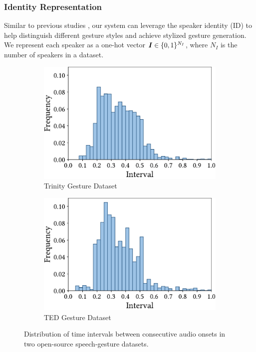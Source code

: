 \subsubsection{Identity Representation}
Similar to previous studies \cite{yoon2020speech,bhattacharya2021speech2affectivegestures}, our system can leverage the speaker identity (ID) to help distinguish different gesture styles and achieve stylized gesture generation. We represent each speaker as a one-hot vector $\bm{I}\in\{0,1\}^{N_I}$, where $N_I$ is the number of speakers in a dataset.
%
\begin{figure}[t]
    \centering    
    \begin{subfigure}[t]{0.47\linewidth}
        \centering
        \caption*{Trinity Gesture Dataset}
        \includegraphics[width=\linewidth]{figures/onset_interval_trinity.pdf}
   \end{subfigure}
   \hspace{\fill}
    \begin{subfigure}[t]{0.47\linewidth}
        \centering
        \caption*{TED Gesture Dataset}
        \includegraphics[width=\linewidth]{figures/onset_interval_TED.pdf}
   \end{subfigure}
    \caption{Distribution of time intervals between consecutive audio onsets in two open-source speech-gesture datasets.}
    \Description{}
    \label{fig:onset_intervals}
\end{figure}
%
